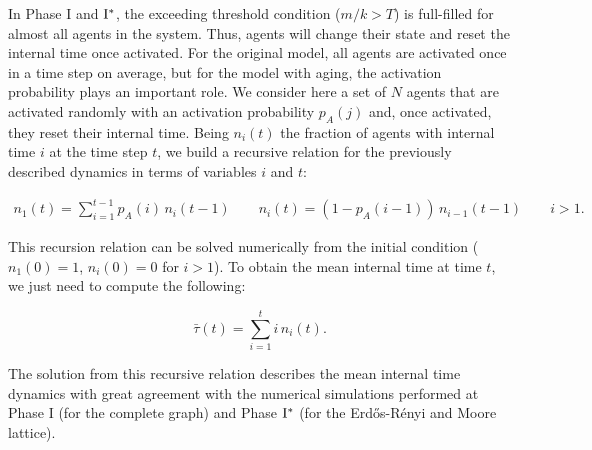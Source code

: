 
In Phase I and ${\rm I}^{*}$, the exceeding threshold condition ($m/k > T$) is full-filled for almost all agents in the system. Thus, agents will change their state and reset the internal time once activated. For the original model, all agents are activated once in a time step on average, but for the model with aging, the activation probability plays an important role. We consider here a set of $N$ agents that are activated randomly with an activation probability $p_A(j)$ and, once activated, they reset their internal time. Being $n_i(t)$ the fraction of agents with internal time $i$ at the time step $t$, we build a recursive relation for the previously described dynamics in terms of variables $i$ and $t$:

\begin{eqnarray}
    n_1(t) = \sum_{i=1}^{t-1} p_A(i) \, n_i(t-1) \quad \quad n_i(t) = (1 - p_A(i-1) ) \, n_{i-1}(t-1)  \qquad i > 1. \label{eq:RR1}
\end{eqnarray}

This recursion relation can be solved numerically from the initial condition ($n_1(0) = 1$, $n_i(0) = 0$ for $i > 1$). To obtain the mean internal time at time $t$, we just need to compute the following:

\begin{equation}
    \label{eq:RR}
    \bar{\tau}(t) = \sum_{i=1}^{t} i \, n_i(t).
\end{equation}

The solution from this recursive relation describes the mean internal time dynamics with great agreement with the numerical simulations performed at Phase I (for the complete graph) and Phase ${\rm  I}^{*}$ (for the Erd\H{o}s-R\'enyi and Moore lattice).